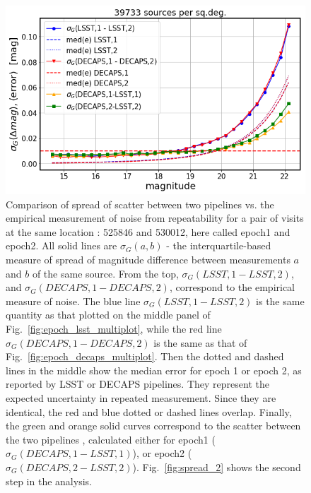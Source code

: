 \documentclass[DM,lsstdraft,toc,usenatbib]{lsstdoc}
\begin{document}
\begin{figure}
\begin{centering}
\includegraphics[width=0.8\columnwidth]{figs/photometric_spread_1_525846-530012.png}
\caption{Comparison of spread of scatter between two pipelines vs.  the empirical measurement of noise from repeatability for a pair of visits at the same location : 525846 and 530012, here called epoch1 and epoch2. All solid lines are $\sigma_{G}(a,b)$ - the interquartile-based measure of spread of magnitude difference between measurements $a$ and $b$ of the same source. From the top,  $\sigma_{G}(LSST,1 - LSST,2)$, and $\sigma_{G}(DECAPS,1 - DECAPS,2)$, correspond to the empirical measure of noise.  The blue line  $\sigma_{G}(LSST,1 - LSST,2)$ is the same quantity as that plotted on the middle panel of Fig.~\ref{fig:epoch_lsst_multiplot}, while the red line  $\sigma_{G}(DECAPS,1 - DECAPS,2)$ is the same as that of Fig.~\ref{fig:epoch_decaps_multiplot}. Then the dotted and dashed lines in the middle show the median error for epoch 1 or epoch 2, as reported by LSST or DECAPS pipelines. They represent the expected uncertainty in repeated measurement.  Since they are identical, the red and blue dotted or dashed lines overlap.  Finally, the green and orange solid curves correspond to the scatter between the two pipelines , calculated either for epoch1 ($\sigma_{G}(DECAPS,1 - LSST,1)$), or epoch2 ($\sigma_{G}(DECAPS,2- LSST,2)$). Fig.~\ref{fig:spread_2} shows the second step in the analysis. }
\label{fig:spread_1}
\end{centering}
\end{figure} 
\end{document}

